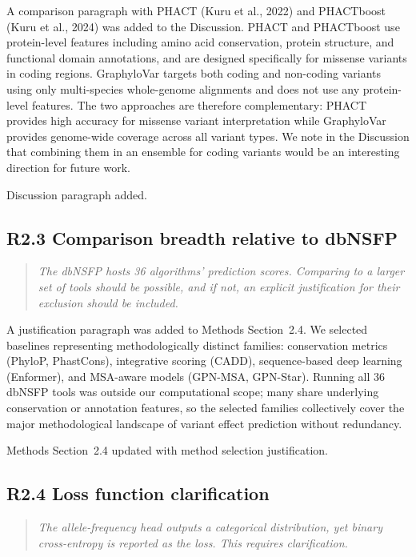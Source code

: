 \documentclass[11pt]{article}
\begin{document}
A comparison paragraph with PHACT (Kuru et al., 2022) and PHACTboost
(Kuru et al., 2024) was added to the Discussion.  PHACT and PHACTboost
use protein-level features including amino acid conservation, protein
structure, and functional domain annotations, and are designed specifically
for missense variants in coding regions.  GraphyloVar targets both coding
and non-coding variants using only multi-species whole-genome alignments
and does not use any protein-level features.  The two approaches are
therefore complementary: PHACT provides high accuracy for missense variant
interpretation while GraphyloVar provides genome-wide coverage across all
variant types.  We note in the Discussion that combining them in an
ensemble for coding variants would be an interesting direction for future
work.

Discussion paragraph added.

\bigskip

\subsection*{R2.3 Comparison breadth relative to dbNSFP}

\begin{quote}
\itshape
The dbNSFP hosts 36 algorithms' prediction scores.  Comparing to a
larger set of tools should be possible, and if not, an explicit
justification for their exclusion should be included.
\end{quote}

A justification paragraph was added to Methods Section~2.4.  We selected
baselines representing methodologically distinct families: conservation
metrics (PhyloP, PhastCons), integrative scoring (CADD), sequence-based
deep learning (Enformer), and MSA-aware models (GPN-MSA, GPN-Star).
Running all 36 dbNSFP tools was outside our computational scope; many
share underlying conservation or annotation features, so the selected
families collectively cover the major methodological landscape of variant
effect prediction without redundancy.

Methods Section~2.4 updated with method selection justification.

\bigskip

\subsection*{R2.4 Loss function clarification}

\begin{quote}
\itshape
The allele-frequency head outputs a categorical distribution, yet
binary cross-entropy is reported as the loss.  This requires
clarification.
\end{quote}
\end{document}
